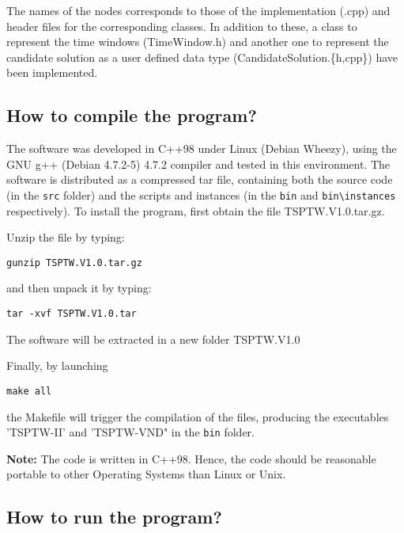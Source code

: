 \documentclass{article}
\begin{document}
The names of the nodes corresponds to those of the implementation (.cpp) and header files for the corresponding classes.
In addition to these, a class to represent the time windows (TimeWindow.h) and another one to represent the candidate solution as
a user defined data type (CandidateSolution.\{h,cpp\}) have been implemented.


\subsection{How to compile the program?}
The software was developed in C++98 under Linux (Debian Wheezy), using the GNU g++ (Debian 4.7.2-5) 4.7.2 compiler and tested in this environment. 
The software is distributed as a compressed tar file, containing both the source code (in the \verb|src| folder) and the scripts and instances (in the \verb|bin| and \verb|bin\instances| respectively).
To install the program, first obtain the file TSPTW.V1.0.tar.gz. 

Unzip the file by typing:

\begin{center}
\begin{verbatim}
gunzip TSPTW.V1.0.tar.gz
\end{verbatim}
\end{center}

and then unpack it by typing:

\begin{center}
\begin{verbatim}
tar -xvf TSPTW.V1.0.tar
\end{verbatim}
\end{center}

The software will be extracted in a new folder TSPTW.V1.0 

Finally, by launching
\begin{center}
\begin{verbatim}
make all
\end{verbatim}
\end{center}

the Makefile will trigger the compilation of the files,
producing the executables 'TSPTW-II' and 'TSPTW-VND" in the \verb|bin| folder.

\textbf{Note:} The code is written in C++98. Hence, the code should be
reasonable portable to other Operating Systems than Linux or Unix.

\subsection{How to run the program?}
\end{document}
